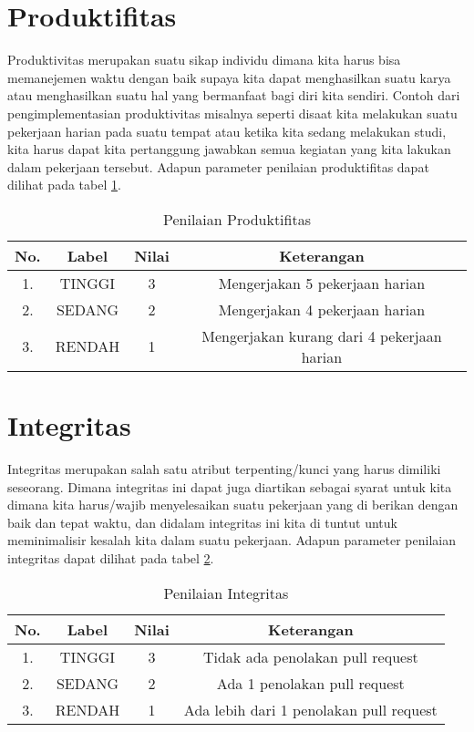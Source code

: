 \section{Produktifitas}
Produktivitas merupakan suatu sikap individu dimana kita harus bisa memanejemen waktu dengan baik supaya kita dapat menghasilkan suatu karya atau menghasilkan suatu hal yang bermanfaat bagi diri kita sendiri. Contoh dari pengimplementasian produktivitas misalnya seperti disaat kita melakukan suatu pekerjaan harian pada suatu tempat atau ketika kita sedang melakukan studi, kita harus dapat kita pertanggung jawabkan semua kegiatan yang kita lakukan dalam pekerjaan tersebut. Adapun parameter penilaian produktifitas dapat dilihat pada tabel \ref{table:nilaiproduktifitas}.

\begin{table}[H]
\caption{Penilaian Produktifitas}
\centering
\begin{tabular}{|c|c|c|c|}
\hline
\textbf{No.}&\textbf{Label}&\textbf{Nilai}&\textbf{Keterangan}\\
\hline
1.&TINGGI&3&Mengerjakan 5 pekerjaan harian\\
\hline
2.&SEDANG&2&Mengerjakan 4 pekerjaan harian\\
\hline
3.&RENDAH&1&Mengerjakan kurang dari 4 pekerjaan harian\\
\hline
\end{tabular}
\label{table:nilaiproduktifitas}
\end{table}

\section{Integritas}
Integritas merupakan salah satu atribut terpenting/kunci yang harus dimiliki seseorang. Dimana integritas ini dapat juga diartikan sebagai syarat untuk kita dimana kita harus/wajib menyelesaikan suatu pekerjaan yang di berikan dengan baik dan tepat waktu, dan didalam integritas ini kita di tuntut untuk meminimalisir kesalah kita dalam suatu pekerjaan. Adapun parameter penilaian integritas dapat dilihat pada tabel \ref{table:nilaiintegritas}.

\begin{table}[H]
\caption{Penilaian Integritas}
\centering
\begin{tabular}{|c|c|c|c|}
\hline
\textbf{No.}&\textbf{Label}&\textbf{Nilai}&\textbf{Keterangan}\\
\hline
1.&TINGGI&3&Tidak ada penolakan pull request\\
\hline
2.&SEDANG&2&Ada 1 penolakan pull request\\
\hline
3.&RENDAH&1&Ada lebih dari 1 penolakan pull request\\
\hline
\end{tabular}
\label{table:nilaiintegritas}
\end{table}


